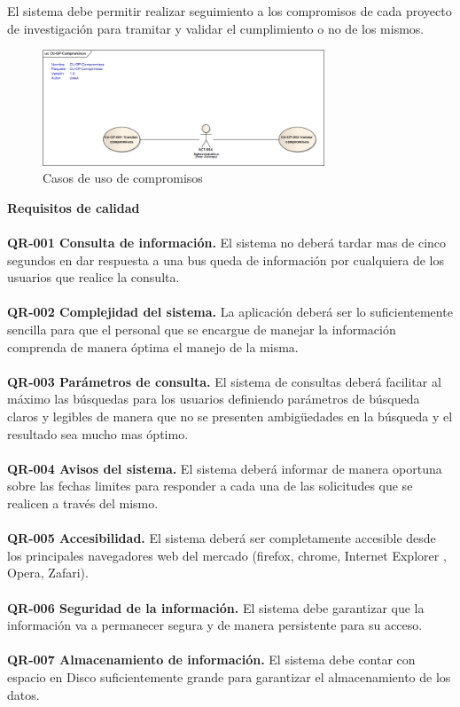 \documentclass[12pt,oneside,letterpaper]{report}
\begin{document}
El sistema debe permitir realizar seguimiento a los compromisos de cada proyecto de investigación para tramitar y validar el cumplimiento o no de los mismos.

\begin{figure}[h!]
  \centering
    \includegraphics[width=0.75\textwidth]{./img/img6.png}
  \caption{Casos de uso de compromisos}
\end{figure}

\textbf{Requisitos de calidad}\\
\\
\textbf{QR-001 Consulta de información.} El sistema no deberá tardar mas de cinco segundos en dar respuesta a una bus queda de información por cualquiera de los usuarios que realice la consulta.\\
\\
\textbf{QR-002 Complejidad del sistema.} La aplicación deberá ser lo suficientemente sencilla para que el personal que se encargue de manejar la información comprenda de manera óptima el manejo de la misma.\\
\\
\textbf{QR-003 Parámetros de consulta.} El sistema de consultas deberá facilitar al máximo las búsquedas para los usuarios definiendo parámetros de búsqueda claros y legibles de manera que no se presenten ambigüedades en la búsqueda y el resultado sea mucho mas óptimo.\\
\\
\textbf{QR-004 Avisos del sistema.} El sistema deberá informar de manera oportuna sobre las fechas limites para responder a cada una de las solicitudes que se realicen a través del mismo.\\
\\
\textbf{QR-005 Accesibilidad.} El sistema deberá ser completamente accesible desde los principales navegadores web del mercado (firefox, chrome, Internet Explorer , Opera, Zafari).\\
\\
\textbf{QR-006 Seguridad de la información.} El sistema debe garantizar que la información va a permanecer segura y de manera persistente para su acceso.\\
\\
\textbf{QR-007 Almacenamiento de información.} El sistema debe contar con espacio en Disco suficientemente grande para garantizar el almacenamiento de los datos.\\
\\
\end{document}
